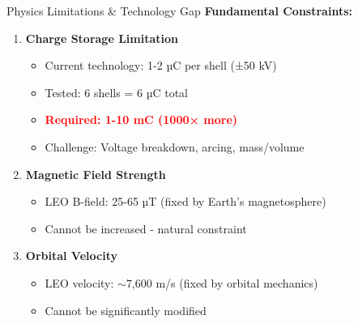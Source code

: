 \documentclass[aspectratio=169]{beamer}
\begin{document}
\begin{frame}{Physics Limitations \& Technology Gap}
\textbf{Fundamental Constraints:}

\begin{enumerate}
    \item \textbf{Charge Storage Limitation}
    \begin{itemize}
        \item Current technology: 1-2 µC per shell (±50 kV)
        \item Tested: 6 shells = 6 µC total
        \item \textcolor{red}{\textbf{Required: 1-10 mC (1000× more)}}
        \item Challenge: Voltage breakdown, arcing, mass/volume
    \end{itemize}

    \vspace{0.2cm}
    \item \textbf{Magnetic Field Strength}
    \begin{itemize}
        \item LEO B-field: 25-65 µT (fixed by Earth's magnetosphere)
        \item Cannot be increased - natural constraint
    \end{itemize}

    \vspace{0.2cm}
    \item \textbf{Orbital Velocity}
    \begin{itemize}
        \item LEO velocity: $\sim$7,600 m/s (fixed by orbital mechanics)
        \item Cannot be significantly modified
    \end{itemize}
\end{enumerate}

\vspace{0.3cm}
\begin{center}
\end{center}
\end{frame}
\end{document}
